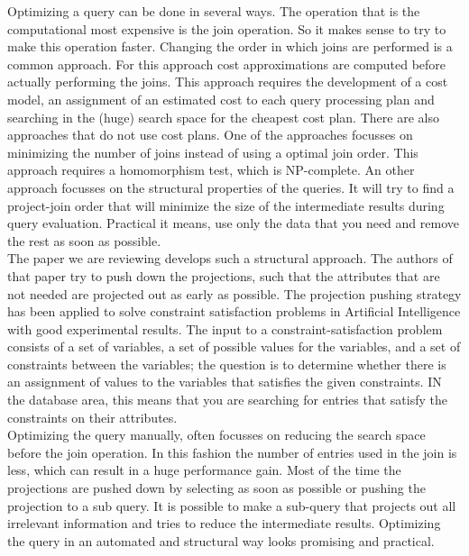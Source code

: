Optimizing a query can be done in several ways. The operation that is the computational most expensive is the join operation. So it makes sense to try to make this operation faster. Changing the order in which joins are performed is a common approach. For this approach cost approximations are computed before actually performing the joins. This approach requires  the development of a cost model, an assignment of an estimated cost to each query processing plan and searching in the (huge) search space for the cheapest cost plan. There are also approaches that do not use cost plans. One of the approaches focusses on minimizing the number of joins instead of using a optimal join order. This approach requires a homomorphism test, which is NP-complete. An other approach focusses on the structural properties of the queries. It will try to find a project-join order that will minimize the size of the intermediate results during query evaluation. Practical it means, use only the data that you need and remove the rest as soon as possible. \\

The paper \cite{paper} we are reviewing develops such a structural approach. The authors of that paper try to push down the projections, such that the attributes that are not needed are projected out as early as possible. The projection pushing strategy has been applied to solve constraint satisfaction problems in Artificial Intelligence with good experimental results. The input to a constraint-satisfaction problem consists of a set of variables, a set of possible values for the variables, and a set of constraints between the variables; the question is to determine whether there is an assignment of values to the variables that satisfies the given constraints. IN the database area, this means that you are searching for entries that satisfy the constraints on their attributes. \\

Optimizing the query manually, often focusses on reducing the search space before the join operation. In this fashion the number of entries used in the join is less, which can result in a huge performance gain. Most of the time the projections are pushed down by selecting as soon as possible or pushing the projection to a sub query. It is possible to make a sub-query that projects out all irrelevant information and tries to reduce the intermediate results. Optimizing the query in an automated and structural way looks promising and practical.  \\